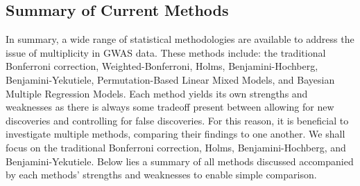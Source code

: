 \documentclass[12pt]{article}
\begin{document}
\subsection{Summary of Current Methods}
In summary, a wide range of statistical methodologies are available to address the issue of multiplicity in GWAS data. These methods include: the traditional Bonferroni correction, Weighted-Bonferroni, Holms, Benjamini-Hochberg, Benjamini-Yekutiele, Permutation-Based Linear Mixed Models, and Bayesian Multiple Regression Models. Each method yields its own strengths and weaknesses as there is always some tradeoff present between allowing for new discoveries and controlling for false discoveries. For this reason, it is beneficial to investigate multiple methods, comparing their findings to one another. We shall focus on the traditional Bonferroni correction, Holms, Benjamini-Hochberg, and Benjamini-Yekutiele. Below lies a summary of all methods discussed accompanied by each methods' strengths and weaknesses to enable simple comparison. \par
\end{document}
